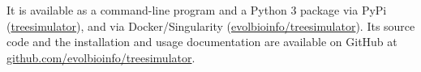 \documentclass[a4paper,10pt]{article}
\begin{document}
It is available as a command-line program and a Python 3 package via PyPi (\href{https://pypi.org/project/treesimulator}{treesimulator}), and via Docker/Singularity (\href{https://hub.docker.com/r/evolbioinfo/treesimulator/tags}{evolbioinfo/treesimulator}). Its source code and the installation and usage documentation are available on GitHub at \href{https://github.com/evolbioinfo/treesimulator}{github.com/evolbioinfo/treesimulator}.
\end{document}
